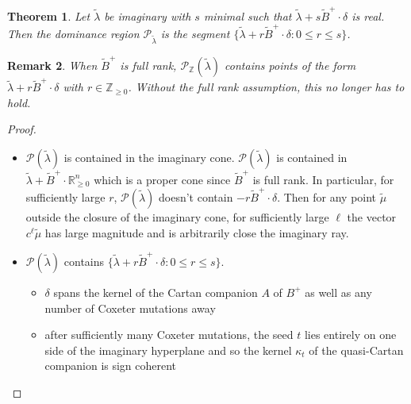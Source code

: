 \documentclass{amsart}
\newtheorem{theorem}{Theorem}
\newtheorem{remark}[theorem]{Remark}
\numberwithin{theorem}{section}
\newcommand{\cP}{\mathcal{P}}
\newcommand{\RR}{\mathbb{R}}
\newcommand{\ZZ}{\mathbb{Z}}
\begin{document}
  \begin{theorem}
    Let $\tilde\lambda$ be imaginary with $s$ minimal such that $\tilde\lambda+s\tilde B^+\cdot\delta$ is real.
    Then the dominance region $\cP_{\tilde\lambda}$ is the segment $\{\tilde\lambda+r\tilde B^+\cdot\delta:0\le r\le s\}$.
  \end{theorem}
  \begin{remark}
    When $\tilde B^+$ is full rank, $\cP_\ZZ(\tilde\lambda)$ contains points of the form $\tilde\lambda+r\tilde B^+\cdot\delta$ with $r\in\ZZ_{\ge0}$.
    Without the full rank assumption, this no longer has to hold.
  \end{remark}
  \begin{proof}
    \begin{itemize}
      \item $\cP(\tilde\lambda)$ is contained in the imaginary cone.
        $\cP(\tilde\lambda)$ is contained in $\tilde\lambda + \tilde B^+ \cdot \RR_{\ge0}^n$ which is a proper cone since $\tilde B^+$ is full rank.
        In particular, for sufficiently large $r$, $\cP(\tilde\lambda)$ doesn't contain $-r \tilde B^+\cdot \delta$.
        Then for any point $\tilde\mu$ outside the closure of the imaginary cone, for sufficiently large $\ell$ the vector $c^\ell \tilde\mu$ has large magnitude and is arbitrarily close the imaginary ray.
      \item $\cP(\tilde\lambda)$ contains $\{\tilde\lambda+r\tilde B^+\cdot\delta:0\le r\le s\}$.
        \begin{itemize}
          \item $\delta$ spans the kernel of the Cartan companion $A$ of $B^+$ as well as any number of Coxeter mutations away
          \item after sufficiently many Coxeter mutations, the seed $t$ lies entirely on one side of the imaginary hyperplane and so the kernel $\kappa_t$ of the quasi-Cartan companion is sign coherent


\end{itemize}
\end{itemize}
\end{proof}
\end{document}
